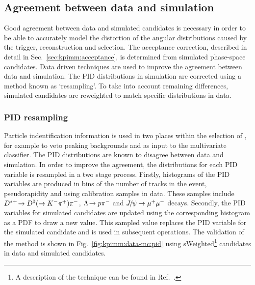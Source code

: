 \subsection{Agreement between data and simulation}
\label{sec:kpimm:data-mc}

Good agreement between data and simulated candidates is necessary in order to be able to accurately model the distortion of the angular distributions caused by the trigger, reconstruction and selection. The acceptance correction, described in detail in Sec.~\ref{sec:kpimm:acceptance}, is determined from simulated phase-space \BdToKpimm candidates. Data driven techniques are used to improve the agreement between data and simulation. The PID distributions in simulation are corrected using a method known as `resampling'. To take into account remaining differences, simulated candidates are reweighted to match specific distributions in data.

\subsubsection{PID resampling}
\label{sec:kpimm:data-mc:resample}

Particle indentification information is used in two places within the selection of \BdToKpimm, for example to veto peaking backgrounds and as input to the multivariate classifier. The PID distributions are known to disagree between data and simulation. In order to improve the agreement, the distributions for each PID variable is resampled in a two stage process. Firstly, histograms of the PID variables are produced in bins of the number of tracks in the event, pseudorapidity and \pt using calibration samples in data. These samples include ${{D}^{*+}}\!\rightarrow {\ensuremath{{D}^0}}(\rightarrow{\ensuremath{{K}^-}}{\ensuremath{{\pi}^+}}){{\pi}^-}$, ${\Lambda}\!\rightarrow {\ensuremath{p}}{\ensuremath{{\pi}^-}}$ and ${{J\mskip -3mu/\mskip -2mu\psi\mskip 2mu}}\!\rightarrow {\ensuremath{\mu^+\mu^-}}$ decays. Secondly, the PID variables for simulated candidates are updated using the corresponding histogram as a PDF to draw a new value. This sampled value replaces the PID variable for the simulated candidate and is used in subsequent operations. The validation of the method is shown in Fig.~\ref{fig:kpimm:data-mc:pid} using sWeighted\footnote{A description of the \sPlot technique can be found in Ref.~\cite{splot}.} \BdToJPsiKst candidates in data and simulated \BdToJPsiKst candidates.

